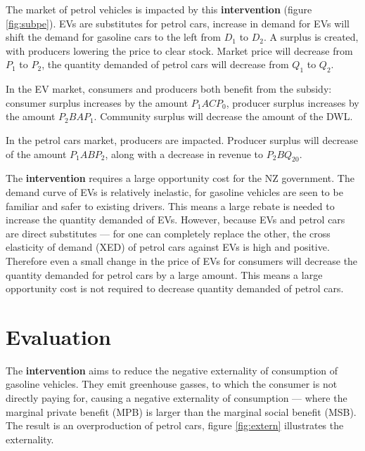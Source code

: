 \documentclass[a4paper,12pt]{article}
\begin{document}
The market of petrol vehicles is impacted by this \textbf{intervention} (figure \ref{fig:subpe}). EVs are substitutes for petrol cars, increase in demand for EVs will shift the demand for gasoline cars to the left from $D_1$ to $D_2$. A surplus is created, with producers lowering the price to clear stock. Market price will decrease from $P_1$ to $P_2$, the quantity demanded of petrol cars will decrease from $Q_1$ to $Q_2$.


In the EV market, consumers and producers both benefit from the subsidy: consumer surplus increases by the amount $P_1ACP_0$, producer surplus increases by the amount $P_2BAP_1$. Community surplus will decrease the amount of the DWL.

In the petrol cars market, producers are impacted. Producer surplus will decrease of the amount $P_1ABP_2$, along with a decrease in revenue to $P_2BQ_20$.

The \textbf{intervention} requires a large opportunity cost for the NZ government. The demand curve of EVs is relatively inelastic, for gasoline vehicles are seen to be familiar and safer to existing drivers. This means a large rebate is needed to increase the quantity demanded of EVs. However, because EVs and petrol cars are direct substitutes --- for one can completely replace the other, the cross elasticity of demand (XED) of petrol cars against EVs is high and positive. Therefore even a small change in the price of EVs for consumers will decrease the quantity demanded for petrol cars by a large amount. This means a large opportunity cost is not required to decrease quantity demanded of petrol cars.

\section*{Evaluation}

The \textbf{intervention} aims to reduce the negative externality of consumption of gasoline vehicles. They emit greenhouse gasses, to which the consumer is not directly paying for, causing a negative externality of consumption --- where the marginal private benefit (MPB) is larger than the marginal social benefit (MSB). The result is an overproduction of petrol cars, figure \ref{fig:extern} illustrates the externality.
\end{document}
